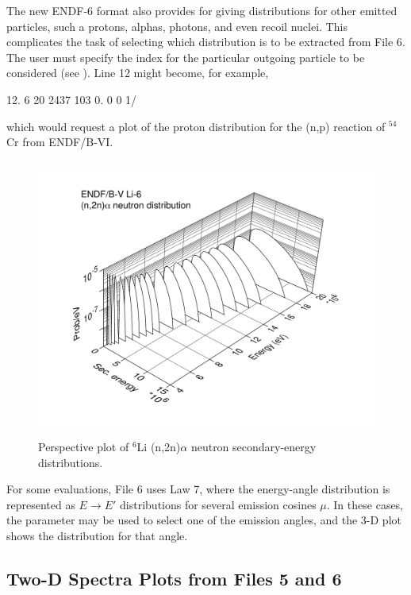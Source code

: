 The new ENDF-6 format also provides for giving distributions
for other emitted particles, such a protons, alphas, photons,
and even recoil nuclei.  This complicates the task of selecting
which distribution is to be extracted from File 6.
The user must specify the index for the particular outgoing
particle to be considered (see ). Line 12 might become,
for example,

\small
\begin{ccode}

  12.  6 20 2437 103 0. 0 0 1/

\end{ccode}
\normalsize

\noindent
which would request a plot of the proton distribution for the
(n,p) reaction of $^{54}$Cr from ENDF/B-VI.

\begin{figure}[thb]\centering
\includegraphics[keepaspectratio, height=3.6in, angle=0]{figs/plotr9ack}
\caption[Sample 3-D plot of neutron secondary-energy distribution data]
{Perspective plot of $^{6}$Li (n,2n)$\alpha$ neutron secondary-energy
 distributions.}
\label{enerd}
\end{figure}

For some evaluations, File 6 uses Law 7, where the energy-angle
distribution is represented as $E{\rightarrow}E'$ distributions
for several emission cosines $\mu$.  In these cases, the 
parameter may be used to select one of the emission angles, and
the 3-D plot shows the distribution for that angle.

\subsection{Two-D Spectra Plots from Files 5 and 6}
\label{ssPLOTR_2D_mf5_mf6}

